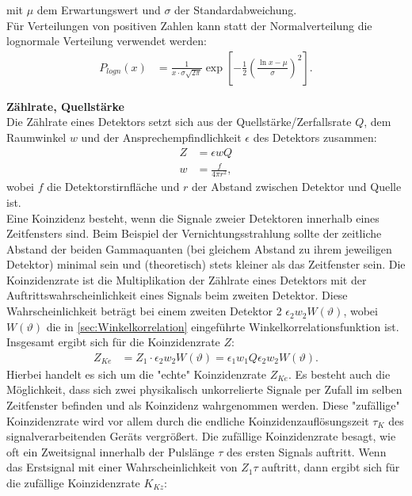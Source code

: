 \documentclass[%
aps,
onecolumn,
11pt,
tightenlines,
nofootinbib,
superscriptaddress,
floatfix,
prd,
]{revtex4-2}
\begin{document}
mit $\mu$ dem Erwartungswert und $\sigma$ der Standardabweichung. \\
Für Verteilungen von positiven Zahlen kann statt der Normalverteilung die lognormale Verteilung verwendet werden:
\begin{align}
	\label{eq:lognormal}
	P_{logn}(x) &= \frac{1}{x \cdot \sigma \sqrt{2\pi}} \exp \left[ -\frac{1}{2} \left ( \frac{\ln x - \mu}{\sigma} \right )^2  \right].
\end{align}\par
\textbf{Zählrate, Quellstärke}\\
Die Zählrate eines Detektors setzt sich aus der Quellstärke/Zerfallsrate $Q$, dem Raumwinkel $w$ und der Ansprechempfindlichkeit $\epsilon$ des Detektors zusammen:
\begin{align}
	Z &= \epsilon w Q \\
	w &= \frac{f}{4 \pi r^2} \nonumber,
\end{align}
wobei $f$ die Detektorstirnfläche und $r$ der Abstand zwischen Detektor und Quelle ist. \\
Eine Koinzidenz besteht, wenn die Signale zweier Detektoren innerhalb eines Zeitfensters sind. Beim Beispiel der Vernichtungsstrahlung sollte der zeitliche Abstand der beiden Gammaquanten (bei gleichem Abstand zu ihrem jeweiligen Detektor) minimal sein und (theoretisch) stets kleiner als das Zeitfenster sein. Die Koinzidenzrate ist die Multiplikation der Zählrate eines Detektors mit der Auftrittswahrscheinlichkeit eines Signals beim zweiten Detektor. Diese Wahrscheinlichkeit beträgt bei einem zweiten Detektor 2 $\epsilon_2w_2W(\vartheta)$, wobei $W(\vartheta)$ die in \ref{sec:Winkelkorrelation} eingeführte Winkelkorrelationsfunktion ist. Insgesamt ergibt sich für die Koinzidenzrate $Z$:
\begin{align}
	Z_{Ke} &= Z_1 \cdot \epsilon_2w_2W(\vartheta) = \epsilon_1 w_1 Q \epsilon_2 w_2 W(\vartheta).
\end{align}
Hierbei handelt es sich um die "echte" Koinzidenzrate $Z_{Ke}$. Es besteht auch die Möglichkeit, dass sich zwei physikalisch unkorrelierte Signale per Zufall im selben Zeitfenster befinden und als Koinzidenz wahrgenommen werden. Diese "zufällige" Koinzidenzrate wird vor allem durch die endliche Koinzidenzauflösungszeit $\tau_K$ des signalverarbeitenden Geräts vergrößert. Die zufällige Koinzidenzrate besagt, wie oft ein Zweitsignal innerhalb der Pulslänge $\tau$ des ersten Signals auftritt. Wenn das Erstsignal mit einer Wahrscheinlichkeit von $Z_1 \tau$ auftritt, dann ergibt sich für die zufällige Koinzidenzrate $K_{Kz}$:
\end{document}

